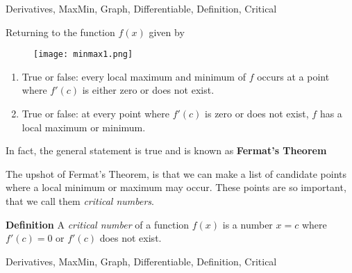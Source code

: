 	
\begin{tagblock}{Derivatives, MaxMin, Graph, Differentiable, Definition, Critical}
\begin{question}
	

Returning to the function $f(x)$ given by

\bigskip

\begin{figure}[h]
\centering
\texttt{[image: minmax1.png]} 
\end{figure}



\begin{enumerate}
\item True or false: every local maximum and minimum of $f$ occurs at a point where $f'(c)$ is either zero or does not exist.

\vspace{.25in}

\item True or false: at every point where $f'(c)$ is zero or does not exist, $f$ has a local maximum or minimum.

\vspace{.25in}


\end{enumerate}

In fact, the general statement is true and is known as \textbf{Fermat's Theorem}

\bigskip

\noindent{}

\bigskip

The upshot of Fermat's Theorem, is that we can make a list of candidate points where a local minimum or maximum may occur.  These points are so important, that we call them \emph{critical numbers}.

\bigskip

\textbf{Definition}  A \emph{critical number} of a function $f(x)$ is a number $x=c$ where $f'(c) =0$ or $f'(c)$ does not exist.




	
\begin{tags}
	   Derivatives, MaxMin, Graph, Differentiable, Definition, Critical
\end{tags}
	
\begin{diary}
\end{diary}
	
\begin{solution}
	   
\end{solution}
	
\end{question}

\end{tagblock}

